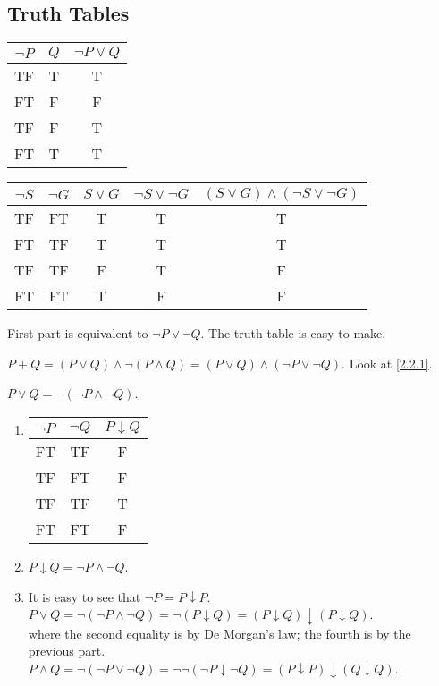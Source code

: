 \subsection{Truth Tables}
\begin{exx} \label{2.2.1}
  \begin{tabular}{c c c}
    $\lnot P$ & $Q$ & $\lnot P \lor Q$ \\
    \hline
    TF & T & T \\
    FT & F & F\\
    TF & F & T\\
    FT & T & T
  \end{tabular}
  \begin{tabular}{c c c c c}
    $\lnot S$ & $\lnot G$ & $S\lor G$ & $\lnot S\lor \lnot G$ & $(S\lor G)\land(\lnot S\lor \lnot G)$ \\
    \hline
    TF & FT & T & T & T \\
    FT & TF & T & T & T \\
    TF & TF & F & T & F \\
    FT & FT & T & F & F
  \end{tabular}
\end{exx}

\begin{exx}
  First part is equivalent to $\lnot P\lor \lnot Q$. The truth table is easy to make.
\end{exx}

\begin{exx} \label{exclusive or}
    $P+Q = (P\lor Q)\land\lnot(P\land Q) = (P\lor Q)\land(\lnot P\lor \lnot Q)$.
    Look at \autoref{2.2.1}.
\end{exx}

\begin{exx}
  $P\lor Q=\lnot(\lnot P\land \lnot Q)$.
\end{exx}

\begin{exx}
  \begin{enumerate}[label=(\alph*)]
    \item \begin{tabular}{c c c}
      $\lnot P$ & $\lnot Q$ & $P\downarrow Q$ \\
      \hline
      FT & TF & F \\
      TF & FT & F \\
      TF & TF & T \\
      FT & FT & F
    \end{tabular}
    \item $P\downarrow Q = \lnot P \land \lnot Q$.
    \item It is easy to see that
    \newline $\lnot P=P\downarrow P$.
    \newline $P\lor Q=\lnot(\lnot P\land \lnot Q)=\lnot(P\downarrow Q)=(P\downarrow Q)\downarrow(P\downarrow Q)$.\\
    where the second equality is by De Morgan's law; the fourth is by the previous part.
    \newline $P\land Q=\lnot(\lnot P \lor \lnot Q)=\lnot\lnot(\lnot P \downarrow \lnot Q)=(P\downarrow P)\downarrow(Q\downarrow Q)$.
  \end{enumerate}
\end{exx}

